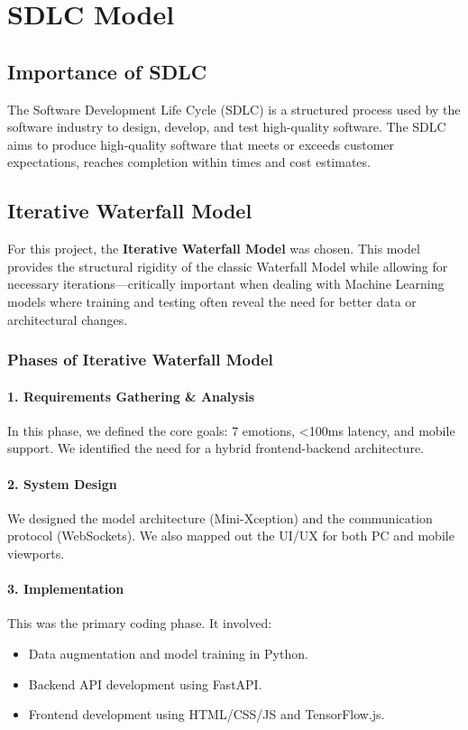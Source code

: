 \documentclass[12pt,a4paper]{report}
\begin{document}
\clearpage

\chapter{SDLC Model}

\section{Importance of SDLC}
The Software Development Life Cycle (SDLC) is a structured process used by the software industry to design, develop, and test high-quality software. The SDLC aims to produce high-quality software that meets or exceeds customer expectations, reaches completion within times and cost estimates.

\section{Iterative Waterfall Model}
For this project, the \textbf{Iterative Waterfall Model} was chosen. This model provides the structural rigidity of the classic Waterfall Model while allowing for necessary iterations—critically important when dealing with Machine Learning models where training and testing often reveal the need for better data or architectural changes.

\subsection{Phases of Iterative Waterfall Model}

\subsubsection{1. Requirements Gathering \& Analysis}
In this phase, we defined the core goals: 7 emotions, <100ms latency, and mobile support. We identified the need for a hybrid frontend-backend architecture.

\subsubsection{2. System Design}
We designed the model architecture (Mini-Xception) and the communication protocol (WebSockets). We also mapped out the UI/UX for both PC and mobile viewports.

\subsubsection{3. Implementation}
This was the primary coding phase. It involved:
\begin{itemize}
    \item Data augmentation and model training in Python.
    \item Backend API development using FastAPI.
    \item Frontend development using HTML/CSS/JS and TensorFlow.js.
\end{itemize}
\end{document}
